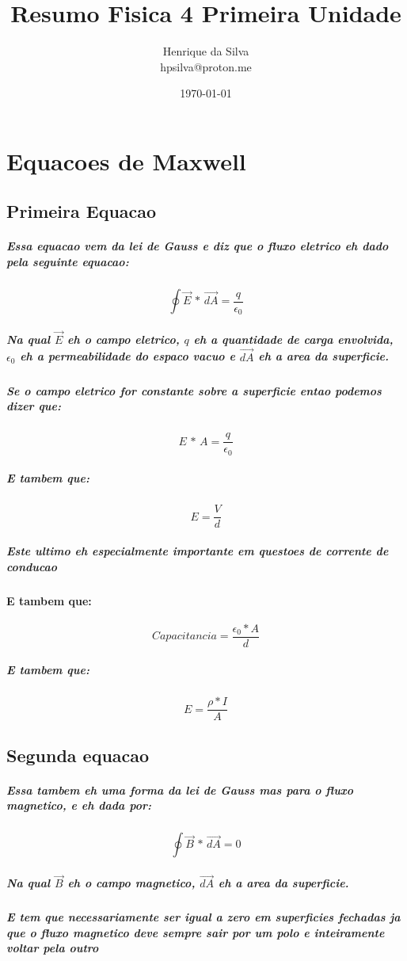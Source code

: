 \documentclass[12pt,twoside, a4paper, twocolumn]{article}
\title{Resumo Fisica 4 Primeira Unidade}
\author{Henrique da Silva \\ hpsilva@proton.me}
\date{\today}
\begin{document}
\maketitle
{}
\newpage
\tableofcontents
\newpage

\newcommand\deriv[2]{\frac{\mathrm d #1}{\mathrm d #2}}

\section{Equacoes de Maxwell}

\subsection{Primeira Equacao}
\subparagraph{Essa equacao vem da lei de Gauss e diz que o fluxo eletrico eh dado pela seguinte equacao:
}
\begin{equation}
    \oint \vec{E} \, * \, \vec{dA} = \frac{q}{\epsilon_0}
\end{equation}
\subparagraph*{Na qual $\vec{E}$ eh o campo eletrico, $q$ eh a quantidade de carga envolvida, $\epsilon_0$ eh a permeabilidade do espaco vacuo e $\vec{dA}$ eh a area da superficie.}
\subparagraph*{Se o campo eletrico for constante sobre a superficie entao podemos dizer que:}
\begin{equation}
    E \, * \, A = \frac{q}{\epsilon_0}
\end{equation}
\subparagraph*{E tambem que:}
\begin{equation}
    E = \frac{V}{d}
\end{equation}
\subparagraph*{Este ultimo eh especialmente importante em questoes de corrente de conducao}
\paragraph*{E tambem que:}
\begin{equation}
    Capacitancia = \frac{\epsilon_0 * A}{d}
\end{equation}
\subparagraph*{E tambem que:}
\begin{equation}
    E = \frac{\rho*I}{A}
\end{equation}

\subsection{Segunda equacao}
\subparagraph*{Essa tambem eh uma forma da lei de Gauss mas para o fluxo magnetico, e eh dada por:}
\begin{equation}
    \oint  \vec{B} \, * \, \vec{dA} = 0
\end{equation}
\subparagraph*{Na qual $\vec{B}$ eh o campo magnetico, $\vec{dA}$ eh a area da superficie.}
\subparagraph*{E tem que necessariamente ser igual a zero \emph{em superficies fechadas} ja que o fluxo magnetico deve sempre sair por um polo e inteiramente voltar pela outro}
\end{document}
